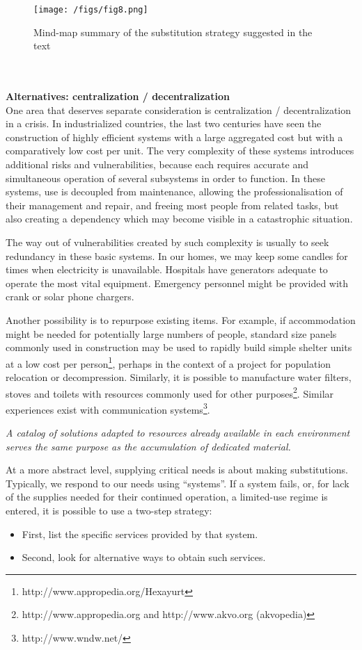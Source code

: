 \documentclass[12pt, a4]{scrartcl}
\begin{document}
\begin{figure}[h]
\centering
\texttt{[image: /figs/fig8.png]}
\caption{Mind-map summary of the substitution strategy suggested in the text}
\end{figure}
\\
\\
\textbf{Alternatives: centralization / decentralization}\\
One area that deserves separate consideration is centralization / decentralization in a crisis. In industrialized countries, the last two centuries have seen the construction of highly efficient systems with a large aggregated cost but with a comparatively low cost per unit. The very complexity of these systems introduces additional risks and vulnerabilities, because each requires accurate and simultaneous operation of several subsystems in order to function. In these systems, use is decoupled from maintenance, allowing the professionalisation of their management and repair, and freeing most people from related tasks, but also creating a dependency which may become visible in a catastrophic situation.

The way out of vulnerabilities created by such complexity is usually to seek redundancy in these basic systems. In our homes, we may keep some candles for times when electricity is unavailable. Hospitals have generators adequate to operate the most vital equipment. Emergency personnel might be provided with crank or solar phone chargers.

Another possibility is to repurpose existing items. For example, if accommodation might be needed for potentially large numbers of people, standard size panels commonly used in construction may be used to rapidly build simple shelter units at a low cost per person\footnote{http://www.appropedia.org/Hexayurt}, perhaps in the context of a project for population relocation or decompression. Similarly, it is possible to manufacture water filters, stoves and toilets with resources commonly used for other purposes\footnote{ http://www.appropedia.org and http://www.akvo.org (akvopedia)}. Similar experiences exist with communication systems\footnote{http://www.wndw.net/}.

\emph{A catalog of solutions adapted to resources already available in each environment serves the same purpose as the accumulation of dedicated material.}

At a more abstract level, supplying critical needs is about making substitutions. Typically, we respond to our needs using “systems”. If a system fails, or, for lack of the supplies needed for their continued operation, a limited-use regime is entered, it is possible to use a two-step strategy: 
\begin{itemize}
	\item First, list the specific services provided by that system.
	\item Second, look for alternative ways to obtain such services.
\end{itemize}
\end{document}
